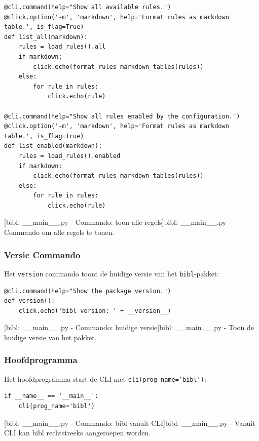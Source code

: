 \begin{verbatim}
@cli.command(help="Show all available rules.")
@click.option('-m', 'markdown', help='Format rules as markdown table.', is_flag=True)
def list_all(markdown):
    rules = load_rules().all
    if markdown:
        click.echo(format_rules_markdown_tables(rules))
    else:
        for rule in rules:
            click.echo(rule)

@cli.command(help="Show all rules enabled by the configuration.")
@click.option('-m', 'markdown', help='Format rules as markdown table.', is_flag=True)
def list_enabled(markdown):
    rules = load_rules().enabled
    if markdown:
        click.echo(format_rules_markdown_tables(rules))
    else:
        for rule in rules:
            click.echo(rule)
\end{verbatim}
[bibl: \_\_main\_\_.py - Commando: toon alle regels]{bibl: \_\_main\_\_.py - Commando om alle regels te tonen. \label{lst:bibl_main_lint_command}}

\subsubsection{Versie Commando}

Het \texttt{version} commando toont de huidige versie van het \texttt{bibl}-pakket:

\begin{verbatim}
@cli.command(help="Show the package version.")
def version():
    click.echo('bibl version: ' + __version__)
\end{verbatim}
[bibl: \_\_main\_\_.py - Commando: huidige versie]{bibl: \_\_main\_\_.py - Toon de huidige versie van het pakket. \label{lst:bibl_version_command}}
\subsubsection{Hoofdprogramma}

Het hoofdprogramma start de CLI met \texttt{cli(prog\_name='bibl')}:

\begin{verbatim}
if __name__ == '__main__':
    cli(prog_name='bibl')
\end{verbatim}
[bibl: \_\_main\_\_.py - Commando: bibl vanuit CLI]{bibl: \_\_main\_\_.py - Vanuit CLI kan bibl rechtstreeks aangeroepen worden. \label{lst:bibl_cli_command}}
